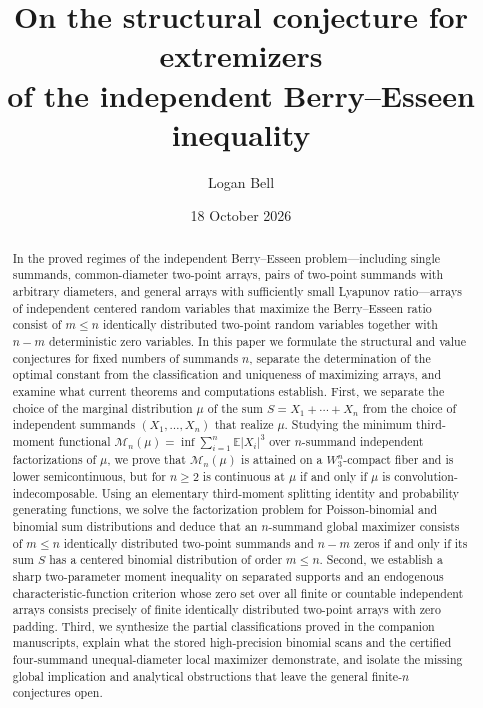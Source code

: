 \documentclass[11pt]{article}
\title{On the structural conjecture for extremizers\\of the independent Berry--Esseen inequality}
\author{Logan Bell}
\date{18 October 2026}
\numberwithin{equation}{section}
\theoremstyle{definition}
\theoremstyle{remark}
\newcommand{\E}{\mathbb E}
\begin{document}
\maketitle

\begin{abstract}
In the proved regimes of the independent Berry--Esseen problem---including
single summands, common-diameter two-point arrays, pairs of two-point
summands with arbitrary diameters, and general arrays with sufficiently small
Lyapunov ratio---arrays of independent centered random variables that maximize
the Berry--Esseen ratio consist of $m\le n$ identically distributed two-point
random variables together with $n-m$ deterministic zero variables. In this
paper we
formulate the structural and value conjectures for fixed numbers of summands
$n$, separate the determination of the optimal constant from the
classification and uniqueness of maximizing arrays, and examine what current
theorems and computations establish. First, we separate the choice of the
marginal distribution $\mu$ of the sum $S=X_1+\cdots+X_n$ from the choice of
independent summands $(X_1,\ldots,X_n)$ that realize $\mu$. Studying the
minimum third-moment functional $\mathcal M_n(\mu)=\inf\sum_{i=1}^n\E|X_i|^3$
over $n$-summand independent factorizations of $\mu$, we prove that
$\mathcal M_n(\mu)$ is attained on a $W_3^n$-compact fiber and is lower
semicontinuous, but for $n\ge2$ is continuous at $\mu$ if and only if $\mu$
is convolution-indecomposable. Using an elementary third-moment splitting
identity and probability generating functions, we solve the factorization
problem for Poisson-binomial and binomial sum distributions and deduce that
an $n$-summand global maximizer consists of $m\le n$ identically distributed
two-point summands and $n-m$ zeros if and only if its sum $S$ has a centered
binomial distribution of order $m\le n$. Second, we establish a sharp
two-parameter moment inequality on separated supports and an endogenous
characteristic-function criterion whose zero set over all finite or countable
independent arrays consists precisely of finite identically distributed
two-point arrays with zero padding. Third, we synthesize the partial
classifications proved in the companion manuscripts, explain what the stored
high-precision binomial scans and the certified four-summand unequal-diameter
local maximizer demonstrate, and isolate the missing global implication and
analytical obstructions that leave the general finite-$n$ conjectures open.
\end{abstract}
\end{document}
